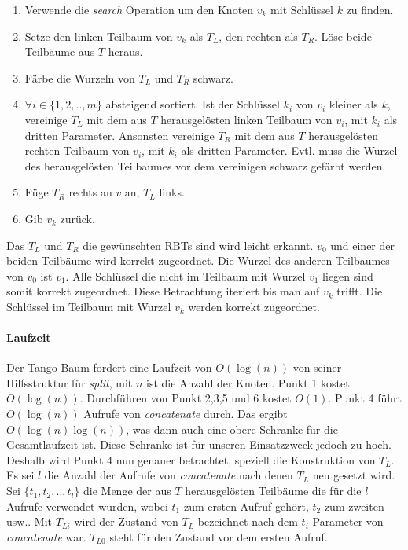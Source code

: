 \documentclass[a4paper,12pt]{article}
\begin{document}
\begin{enumerate}
	\item Verwende die \textit{search} Operation um den Knoten $v_k$ mit Schlüssel $k$ zu finden.
	\item Setze den linken Teilbaum von $v_k$ als $T_L$, den rechten als $T_R$. Löse beide Teilbäume aus $T$ heraus.
	\item Färbe die Wurzeln von $T_L$ und $T_R$ schwarz.
	\item $\forall i \in \{1,2,..,m\}$ absteigend sortiert. Ist der Schlüssel $k_i$ von $v_i$ kleiner als $k$, vereinige $T_L$ mit dem aus $T$ herausgelösten linken Teilbaum von $v_i$, mit  $k_i$ als dritten Parameter. Ansonsten vereinige $T_R$ mit dem aus $T$ herausgelösten rechten Teilbaum von $v_i$, mit  $k_i$ als dritten Parameter. Evtl. muss die Wurzel des herausgelösten Teilbaumes vor dem vereinigen schwarz gefärbt werden. 
	\item Füge $T_R$ rechts an $v$ an, $T_L$ links.
	\item Gib $v_k$ zurück.
\end{enumerate}   
Das $T_L$ und $T_R$ die gewünschten RBTs sind wird leicht erkannt. $v_0$ und einer der beiden Teilbäume wird korrekt zugeordnet. Die Wurzel des anderen Teilbaumes von $v_0$ ist $v_{1}$. Alle Schlüssel die nicht im Teilbaum mit Wurzel $v_{1}$ liegen sind somit korrekt zugeordnet. Diese Betrachtung iteriert bis man auf $v_k$ trifft. Die Schlüssel im Teilbaum mit Wurzel $v_k$ werden korrekt zugeordnet. 

\paragraph{Laufzeit}
Der Tango-Baum fordert eine Laufzeit von $O(\log(n))$ von seiner Hilfsstruktur für \textit{split}, mit $n$ ist die Anzahl der Knoten. Punkt 1 kostet $O(\log(n))$. Durchführen von Punkt 2,3,5 und 6 kostet $O(1)$. Punkt 4 führt $O(\log (n))$ Aufrufe von \textit{concatenate} durch. Das ergibt $O(\log (n) \log (n))$, was dann auch eine obere Schranke für die Gesamtlaufzeit ist. Diese Schranke ist für unseren Einsatzzweck jedoch zu hoch.\\ Deshalb wird Punkt 4 nun genauer betrachtet, speziell die Konstruktion von $T_L$. Es sei $l$ die Anzahl der Aufrufe von \textit{concatenate} nach denen $T_L$ neu gesetzt wird. Sei $\{t_1,t_2,..,t_l\}$ die Menge der aus $T$ herausgelösten Teilbäume die für die $l$ Aufrufe verwendet wurden, wobei $t_1$ zum ersten Aufruf gehört, $t_2$ zum zweiten usw.. Mit $T_{Li}$ wird der Zustand von $T_L$ bezeichnet nach dem $t_i$ Parameter von \textit{concatenate} war.  $T_{L0}$ steht für den Zustand vor dem ersten Aufruf.\\
\end{document}
